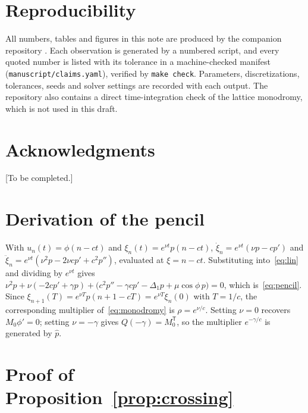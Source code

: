\documentclass[11pt]{article}
\theoremstyle{plain}
\theoremstyle{definition}
\theoremstyle{remark}
\newcommand{\ph}{\hat p}
\newcommand{\T}{\mathsf T}
\begin{document}
\section*{Reproducibility}

All numbers, tables and figures in this note are produced by the companion repository
\RepoURL. Each observation is generated by a numbered script, and every quoted number is
listed with its tolerance in a machine-checked manifest (\texttt{manuscript/claims.yaml}),
verified by \texttt{make check}. Parameters, discretizations, tolerances, seeds and solver
settings are recorded with each output. The repository also contains a direct
time-integration check of the lattice monodromy, which is not used in this draft.

\section*{Acknowledgments}
[To be completed.]

\appendix
\section{Derivation of the pencil}\label{app:pencil}

With $u_n(t)=\phi(n-ct)$ and $\xi_n(t)=e^{\nu t}p(n-ct)$,
$\dot\xi_n=e^{\nu t}(\nu p-cp')$ and $\ddot\xi_n=e^{\nu t}(\nu^2p-2\nu cp'+c^2p'')$, evaluated at
$\xi=n-ct$. Substituting into~\eqref{eq:lin} and dividing by $e^{\nu t}$ gives
$\nu^2p+\nu(-2cp'+\gamma p)+\bigl(c^2p''-\gamma cp'-\Delta_1p+\mu\cos\phi\,p\bigr)=0$,
which is~\eqref{eq:pencil}. Since $\xi_{n+1}(T)=e^{\nu T}p(n+1-cT)=e^{\nu T}\xi_n(0)$ with
$T=1/c$, the corresponding multiplier of~\eqref{eq:monodromy} is $\rho=e^{\nu/c}$. Setting
$\nu=0$ recovers $M_0\phi'=0$; setting $\nu=-\gamma$ gives $Q(-\gamma)=M_0^{\T}$, so the
multiplier $e^{-\gamma/c}$ is generated by $\ph$.

\section{Proof of Proposition~\ref{prop:crossing}}\label{app:ls}
\end{document}
